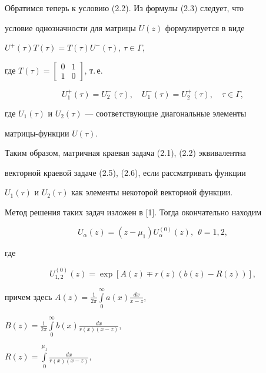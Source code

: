 Обратимся теперь к условию (2.2). Из формулы (2.3) следует, что 


условие однозначности для матрицы $U(z)$ формулируется в виде 


$U^+(\tau)T(\tau)=T(\tau)U^-(\tau)$, $\tau\in\Gamma$, 


где $T(\tau)=\left[\begin{smallmatrix}0 & 1 \\ 1 & 0 


\end{smallmatrix}\right]$, т.\,е. 


\begin{equation} 


U^+_1(\tau)=U^-_2(\tau),\quad 


U^-_1(\tau)=U^+_2(\tau),\quad \tau\in\Gamma, 


\end{equation} 


где $U_1(\tau)$ и $U_2(\tau)$ --- соответствующие диагональные элементы 


матрицы-функции $U(\tau)$. 


 


Таким образом, матричная краевая задача (2.1), (2.2) эквивалентна 


векторной краевой задаче (2.5), (2.6), если рассматривать функции 


$U_1(\tau)$ и $U_2(\tau)$ как элементы некоторой векторной функции. 


Метод решения таких задач изложен в [1]. Тогда окончательно находим


\begin{equation} 


U_\alpha(z)=(z-\mu_1)U^{(0)}_\alpha(z),\ \ \theta=1,2, 


\end{equation} 


где 


\begin{equation} 


U^{(0)}_{1,2}(z)=\exp[A(z)\mp r(z)(b(z)-R(z))], 


\end{equation} 


причем здесь $A(z)=\frac{1}{2\pi}\int\limits^\infty_0 a(x)\frac{dx}{x-z}$, 


$B(z)=\frac{1}{2\pi}\int\limits^\infty_0 b(x)\frac{dx}{r(x)(x-z)}$, 


$R(z)=\int\limits^{\mu_1}_0 \frac{dx}{r(x)(x-z)}$, 


